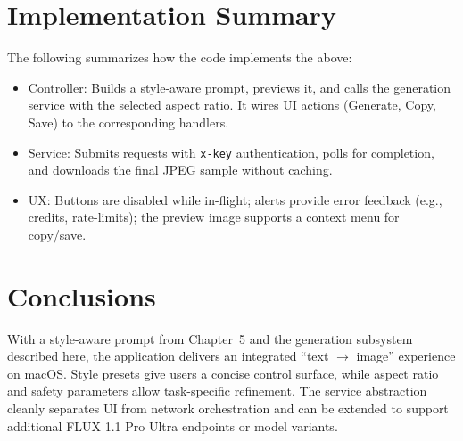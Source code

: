 \section{Implementation Summary}
The following summarizes how the code implements the above:
\begin{itemize}
  \item Controller: Builds a style-aware prompt, previews it, and calls the generation service with the selected aspect ratio. It wires UI actions (Generate, Copy, Save) to the corresponding handlers.
  \item Service: Submits requests with \texttt{x-key} authentication, polls for completion, and downloads the final JPEG sample without caching.
  \item UX: Buttons are disabled while in-flight; alerts provide error feedback (e.g., credits, rate-limits); the preview image supports a context menu for copy/save.
\end{itemize}

\section{Conclusions}
With a style-aware prompt from Chapter~5 and the generation subsystem described here, the application delivers an integrated ``text $\rightarrow$ image'' experience on macOS. Style presets give users a concise control surface, while aspect ratio and safety parameters allow task-specific refinement. The service abstraction cleanly separates UI from network orchestration and can be extended to support additional FLUX 1.1 Pro Ultra endpoints or model variants.

